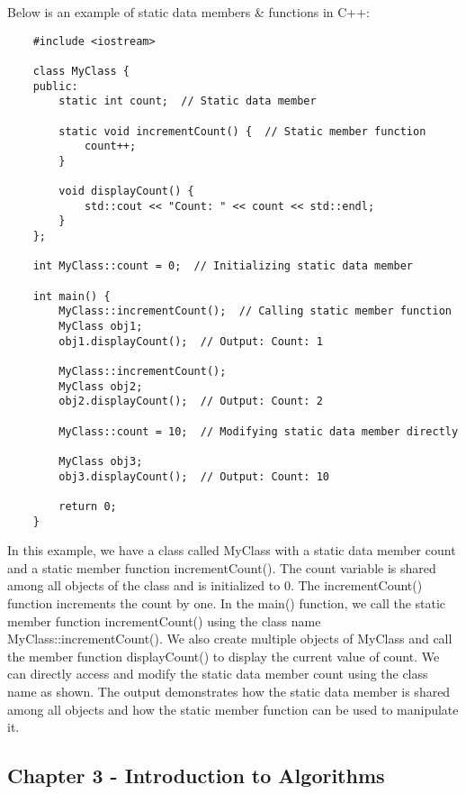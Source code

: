 \begin{solution}
    Below is an example of static data members \& functions in C++: \\
    \horizontalline
    \begin{verbatim}
    #include <iostream>
    
    class MyClass {
    public:
        static int count;  // Static data member
    
        static void incrementCount() {  // Static member function
            count++;
        }
    
        void displayCount() {
            std::cout << "Count: " << count << std::endl;
        }
    };
    
    int MyClass::count = 0;  // Initializing static data member
    
    int main() {
        MyClass::incrementCount();  // Calling static member function
        MyClass obj1;
        obj1.displayCount();  // Output: Count: 1
    
        MyClass::incrementCount();
        MyClass obj2;
        obj2.displayCount();  // Output: Count: 2
    
        MyClass::count = 10;  // Modifying static data member directly
    
        MyClass obj3;
        obj3.displayCount();  // Output: Count: 10
    
        return 0;
    }
    \end{verbatim}
    
    \horizontalline

    In this example, we have a class called MyClass with a static data member count and a static member function incrementCount(). The count variable is shared among all objects of the class and is initialized to 0. The incrementCount() function increments the count by one. In the main() function, we call the static member 
    function incrementCount() using the class name MyClass::incrementCount(). We also create multiple objects of MyClass and call the member function displayCount() to display the current value of count. We can directly access and modify the static data member count using the class name as shown. The output demonstrates how 
    the static data member is shared among all objects and how the static member function can be used to manipulate it.
\end{solution}

\subsection{Chapter 3 - Introduction to Algorithms}

